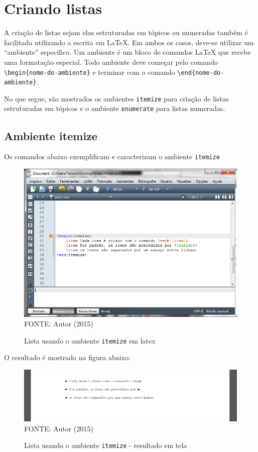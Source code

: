 \section{Criando listas}

A criação de listas sejam elas estruturadas em tópicos ou numeradas  também é facilitada utilizando a escrita em LaTeX. Em ambos os casos, deve-se utilizar um ``ambiente'' específico. Um ambiente é um bloco de comandos LaTeX que recebe uma formatação especial. Todo ambiente deve começar pelo comando \verb!\begin{nome-do-ambiente}! e terminar com o comando \verb!\end{nome-do-ambiente}!.

No que segue, são mostrados os ambientes \texttt{itemize} para criação de listas estruturadas em tópicos e o ambiente \texttt{enumerate} para listas numeradas.

\subsection{Ambiente itemize}

Os comandos abaixo exemplificam e caracterizam o ambiente \texttt{itemize}
	\begin{figure}[H]
	\centering
	\caption{Lista usando o ambiente \texttt{itemize} em latex}
	\includegraphics[scale=0.5]
	{img/fig03.png}\label{fig03}\\
	FONTE: Autor (2015)
	\end{figure}

O resultado é mostrado na figura abaixo:
	\begin{figure}[H]
	\centering
	\caption{Lista usando o ambiente \texttt{itemize}  - resultado em tela}
	\includegraphics[scale=0.4]
	{img/fig04.png}\label{fig04}\\
	FONTE: Autor (2015)
	\end{figure}
	


